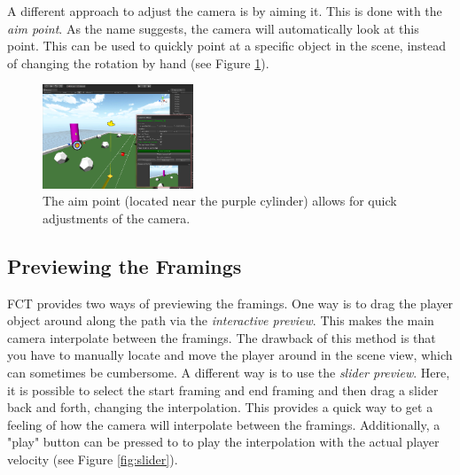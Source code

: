 A different approach to adjust the camera is by aiming it. This is done with the \textit{aim point}. As the name suggests, the camera will automatically look at this point. This can be used to quickly point at a specific object in the scene, instead of changing the rotation by hand (see Figure \ref{fig:aimPoint}).

\begin{figure}[htbp]
\centering
\includegraphics[width=0.4\textwidth]{Pics/aimPoint}
\caption{The aim point (located near the purple cylinder) allows for quick adjustments of the camera.}
\label{fig:aimPoint}
\end{figure}


\subsection{Previewing the Framings}
FCT provides two ways of previewing the framings. One way is to drag the player object around along the path via the \textit{interactive preview}. This makes the main camera interpolate between the framings. The drawback of this method is that you have to manually locate and move the player around in the scene view, which can sometimes be cumbersome. A different way is to use the \textit{slider preview}. Here, it is possible to select the start framing and end framing and then drag a slider back and forth, changing the interpolation. This provides a quick way to get a feeling of how the camera will interpolate between the framings. Additionally, a "play" button can be pressed to to play the interpolation with the actual player velocity (see Figure \ref{fig:slider}).

